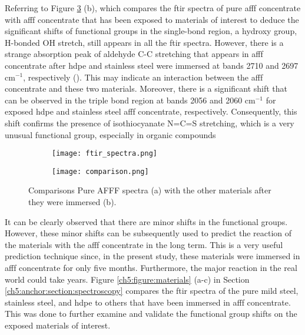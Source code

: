Referring to Figure \ref{ch5:figure:spectra} (b), which compares the \acrshort{ftir} spectra of pure \acrshort{afff} concentrate with \acrshort{afff} concentrate that has been exposed to materials of interest to deduce the significant shifts of functional groups in the single-bond region, a hydroxy group, H-bonded OH stretch, still appears in all the \acrshort{ftir} spectra. However, there is a strange absorption peak of aldehyde C-C stretching that appears in \acrshort{afff} concentrate after \acrshort{hdpe} and stainless steel were immersed at bands 2710 and 2697 cm$^{-1}$, respectively (\cite{lin1991handbook}). This may indicate an interaction between the \acrshort{afff} concentrate and these two materials. Moreover, there is a significant shift that can be observed in the triple bond region at bands 2056 and 2060 cm$^{-1}$ for exposed \acrshort{hdpe} and stainless steel \acrshort{afff} concentrate, respectively. Consequently, this shift confirms the presence of isothiocyanate N=C=S stretching, which is a very unusual functional group, especially in organic compounds

\begin{figure}[H]
\centering

\begin{subfigure}{.49\textwidth}
    \texttt{[image: ftir\_spectra.png]}
    \caption{}
    \label{ch5:figure:spectra:a}
\end{subfigure}
\begin{subfigure}{.49\textwidth}
    \texttt{[image: comparison.png]}
    \caption{}
    \label{ch5:figure:spectra:b}
\end{subfigure}

\caption{Comparisons Pure AFFF spectra (a) with the other materials after they were immersed (b).}
\label{ch5:figure:spectra}
\end{figure}

It can be clearly observed that there are minor shifts in the functional groups. However, these minor shifts can be subsequently used to predict the reaction of the materials with the \acrshort{afff} concentrate in the long term. This is a very useful prediction technique since, in the present study, these materials were immersed in \acrshort{afff} concentrate for only five months. Furthermore, the major reaction in the real world could take years. Figure \ref{ch5:figure:materials} (a-c) in Section \ref{ch5:anchor:section:spectroscopy} compares the \acrshort{ftir} spectra of the pure mild steel, stainless steel, and \acrshort{hdpe} to others that have been immersed in \acrshort{afff} concentrate. This was done to further examine and validate the functional group shifts on the exposed materials of interest.


